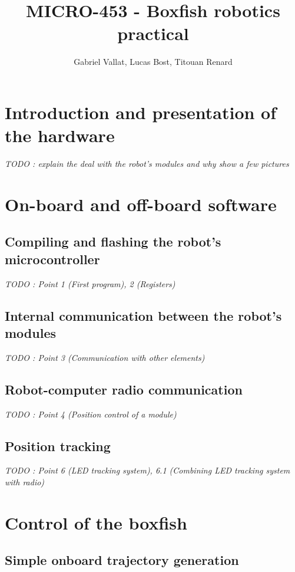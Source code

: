 \documentclass[11pt]{article}
\title{MICRO-453 - Boxfish robotics practical}
\author{Gabriel Vallat, Lucas Bost, Titouan Renard}
\begin{document}
\maketitle
\tableofcontents
\section{Introduction and presentation of the hardware}

\textit{TODO : explain the deal with the robot's modules and why show a few pictures}  \cite{einstein} 

\section{On-board and off-board software}


\subsection{Compiling and flashing the robot's microcontroller}

\textit{TODO : Point 1 (First program), 2 (Registers)}

\subsection{Internal communication between the robot's modules}

\textit{TODO : Point 3 (Communication with other elements)}

\subsection{Robot-computer radio communication}

\textit{TODO : Point 4 (Position control of a module)}

\subsection{Position tracking}

\textit{TODO : Point 6 (LED tracking system), 6.1 (Combining LED tracking system with radio)}

\section{Control of the boxfish}

\subsection{Simple onboard trajectory generation}
\end{document}
